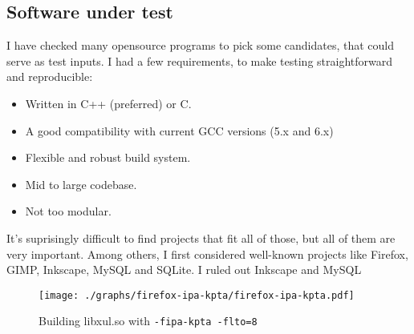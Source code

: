 \subsection{Software under test}

I have checked many opensource programs to pick some candidates, that could
serve as test inputs. I had a few requirements, to make testing straightforward
and reproducible:

\begin{itemize}
	\item Written in C++ (preferred) or C.
	\item A good compatibility with current GCC versions (5.x and 6.x)
	\item Flexible and robust build system.
	\item Mid to large codebase.
	\item Not too modular.
\end{itemize}

It's suprisingly difficult to find projects that fit all of those, but all of
them are very important. Among others, I first considered well-known projects
like Firefox, GIMP, Inkscape, MySQL and SQLite. I ruled out Inkscape and MySQL




\begin{figure}[h!]
	\label{figure-firefox-ipa-kpta}
	\centering
	\texttt{[image: ./graphs/firefox-ipa-kpta/firefox-ipa-kpta.pdf]}
	\caption{Building libxul.so with {\tt -fipa-kpta -flto=8}}
\end{figure}
